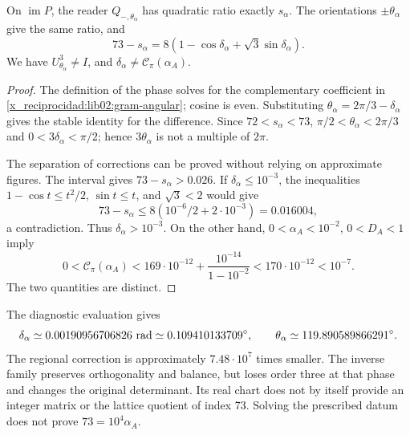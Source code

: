 \begin{corollary}
\label{x_reciprocidad:lib02:fase-alpha}
On \(\operatorname{im}P\), the reader \(Q_{-,\theta_\alpha}\) has quadratic ratio exactly \(s_\alpha\). The orientations \(\pm\theta_\alpha\) give the same ratio, and
\[
 73-s_\alpha
 =8(1-\cos\delta_\alpha+\sqrt3\sin\delta_\alpha).
\]
We have \(U_{\theta_\alpha}^3\ne I\), and \(\delta_\alpha\ne\mathcal C_\pi(\alpha_A)\).
\end{corollary}
\begin{proof}
The definition of the phase solves for the complementary coefficient in \eqref{x_reciprocidad:lib02:gram-angular}; cosine is even. Substituting \(\theta_\alpha=2\pi/3-\delta_\alpha\) gives the stable identity for the difference. Since \(72<s_\alpha<73\), \(\pi/2<\theta_\alpha<2\pi/3\) and \(0<3\delta_\alpha<\pi/2\); hence \(3\theta_\alpha\) is not a multiple of \(2\pi\).

The separation of corrections can be proved without relying on approximate figures. The interval gives \(73-s_\alpha>0.026\). If \(\delta_\alpha\leq10^{-3}\), the inequalities \(1-\cos t\leq t^2/2\), \(\sin t\leq t\), and \(\sqrt3<2\) would give
\[
 73-s_\alpha\leq8(10^{-6}/2+2\cdot10^{-3})=0.016004,
\]
a contradiction. Thus \(\delta_\alpha>10^{-3}\). On the other hand, \(0<\alpha_A<10^{-2}\), \(0<D_A<1\) imply
\[
 0<\mathcal C_\pi(\alpha_A)
 <169\cdot10^{-12}+\frac{10^{-14}}{1-10^{-2}}
 <170\cdot10^{-12}<10^{-7}.
\]
The two quantities are distinct.
\end{proof}

The diagnostic evaluation gives
\[
 \delta_\alpha\simeq0.00190956706826\ {\rm rad}
 \simeq0.109410133709^\circ,\qquad
 \theta_\alpha\simeq119.890589866291^\circ.
\]
The regional correction is approximately \(7.48\cdot10^7\) times
smaller. The inverse family preserves orthogonality and balance, but loses
order three at that phase and changes the original determinant. Its real
chart does not by itself provide an integer matrix or the lattice quotient of
index 73. Solving the prescribed datum does not prove
\(73=10^4\alpha_A\).


